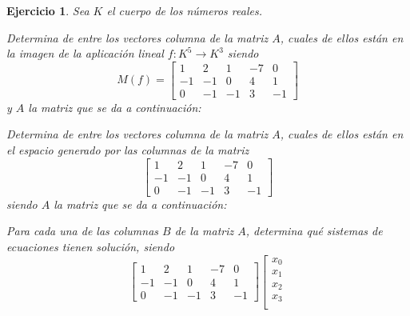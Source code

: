 \documentclass[12pt]{amsart}
\newtheorem{ejer}{Ejercicio}
\begin{document}
\begin{ejer} Sea $K$ el cuerpo de los n\'umeros reales.
\newline
\noindent\begin{minipage}{\textwidth}
\begin{tcolorbox}[colback = green!20!white,title=Versión Núcleo]
Determina de entre los vectores columna de la matriz $A$, cuales de ellos están en la imagen de la aplicación lineal $f:K^{5} \to K^{3}$ siendo  $$ M(f) = \left[\begin{array}{rrrrr}
1 & 2 & 1 & -7 & 0 \\
-1 & -1 & 0 & 4 & 1 \\
0 & -1 & -1 & 3 & -1
\end{array}\right] $$ y $A$ la matriz que se da a continuación:\end{tcolorbox}
\end{minipage} \newline
\noindent\begin{minipage}{\textwidth}
\begin{tcolorbox}[colback = blue!20!white,title=Versión Anulador]
Determina de entre los vectores columna de la matriz $A$, cuales de ellos están en el espacio generado por las columnas de la matriz $$ \left[\begin{array}{rrrrr}
1 & 2 & 1 & -7 & 0 \\
-1 & -1 & 0 & 4 & 1 \\
0 & -1 & -1 & 3 & -1
\end{array}\right] $$ siendo $A$ la matriz que se da a continuación:\end{tcolorbox}
\end{minipage} \newline
\noindent\begin{minipage}{\textwidth} 
\begin{tcolorbox}[colback = red!20!white,title=Versión Ecuaciones Implícitas]
Para cada una de las columnas $B$ de la matriz $A$, determina qué sistemas de ecuaciones tienen solución, siendo $$ \left[\begin{array}{rrrrr}
1 & 2 & 1 & -7 & 0 \\
-1 & -1 & 0 & 4 & 1 \\
0 & -1 & -1 & 3 & -1
\end{array}\right] \left[\begin{array}{r}
x_{0} \\
x_{1} \\
x_{2} \\
x_{3} \\

\end{array}$$
\end{tcolorbox}
\end{minipage}
\end{ejer}
\end{document}
